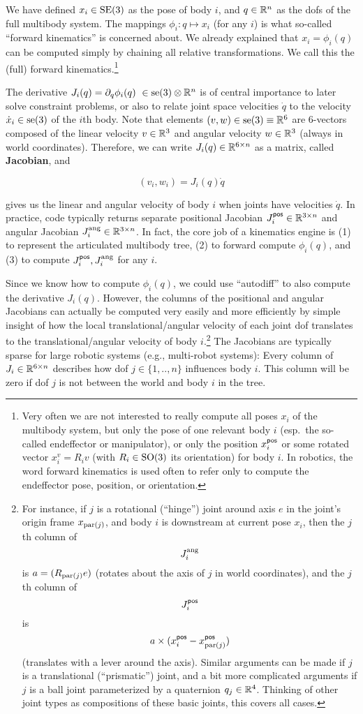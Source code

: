 We have defined $x_i\in\text{SE}(3)$ as the pose of body $i$, and
$q\in{\mathbb{R}}^n$ as the dofs of the full multibody system. The mappings $\phi_i: q
\mapsto x_i$ (for any $i$) is what so-called ``forward kinematics'' is
concerned about. We already explained that $x_i = \phi_i(q)$ can be
computed simply by chaining all relative transformations. We call this
the (full) forward kinematics.\footnote{Very often we are not interested to
really compute all poses $x_i$ of the multibody system, but only the
pose of one relevant body $i$ (esp.\ the so-called endeffector or
manipulator), or only the position $x^{\textsf{pos}}_i$ or some rotated vector $x^v_i
= R_i v$ (with $R_i \in \text{SO}(3)$ its orientation) for body
$i$. In robotics, the word forward kinematics is used often to refer
only to compute the endeffector pose, position, or orientation.}

The derivative $J_i(q)=\partial_q \phi_i(q) ~ \in \text{se}(3) \otimes {\mathbb{R}}^n$ is
of central importance to later solve constraint problems, or also to
relate joint space velocities $\dot q$ to the velocity $\dot x_i \in
\text{se}(3)$ of the $i$th body. Note that elements $(v,w)\in \text{se}(3) \equiv
{\mathbb{R}}^6$ are 6-vectors composed of the linear velocity $v\in{\mathbb{R}}^3$ and
angular velocity $w\in{\mathbb{R}}^3$ (always in world
coordinates). Therefore, we can write $J_i(q) \in {\mathbb{R}}^{6 \times n}$
as a matrix, called \textbf{Jacobian}, and

$$(v_i,w_i) = J_i(q) \dot q$$

gives us the linear and angular velocity of body $i$ when joints have
velocities $\dot q$. In practice, code typically returns separate positional Jacobian $J_i^{\textsf{pos}} \in {\mathbb{R}}^{3\times n}$ and angular
Jacobian $J_i^{\text{ang}} \in {\mathbb{R}}^{3\times n}$. In fact, the core job of a
kinematics engine is (1) to represent the articulated multibody tree,
(2) to forward compute $\phi_i(q)$, and (3) to compute
$J_i^{\textsf{pos}}, J_i^{\text{ang}}$ for any $i$.

Since we know how to compute $\phi_i(q)$, we could use ``autodiff'' to
also compute the derivative $J_i(q)$. However, the columns of the positional and
angular Jacobians can actually be computed very easily and more efficiently by simple
insight of how the local translational/angular velocity of each
joint dof translates to the translational/angular velocity of body
$i$.\footnote{For instance, if $j$ is a rotational (``hinge'') joint
around axis $e$ in the joint's origin frame $x_{\text{par}(j)}$, and body
$i$ is downstream at current pose $x_i$, then the $j$th column of
$$J^{\text{ang}}_i$$ is $a = (R_{\text{par}(j)} e)$ (rotates about the axis of
$j$ in world coordinates), and the $j$th column of $$J^{\textsf{pos}}_i$$ is
$$a \times (x^{\textsf{pos}}_i - x^{\textsf{pos}}_{\text{par}(j)})$$ (translates with a lever around
the axis). Similar arguments can be made if $j$ is a translational
(``prismatic'') joint, and a bit more complicated arguments if $j$ is
a ball joint parameterized by a quaternion $q_j \in{\mathbb{R}}^4$. Thinking
of other joint types as compositions of these basic joints, this
covers all cases.
}
The Jacobians are typically sparse for large robotic systems (e.g.,
multi-robot systems): Every column of $J_i\in{\mathbb{R}}^{6\times n}$
describes how dof $j\in\{1,..,n\}$ influences body $i$. This column
will be zero if dof $j$ is not between the world and body $i$ in the
tree.

